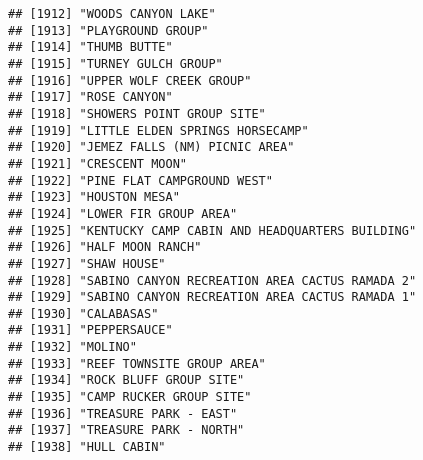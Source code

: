 \documentclass[
]{article}
\begin{document}
\begin{verbatim}
## [1912] "WOODS CANYON LAKE"                                                                   
## [1913] "PLAYGROUND GROUP"                                                                    
## [1914] "THUMB BUTTE"                                                                         
## [1915] "TURNEY GULCH GROUP"                                                                  
## [1916] "UPPER WOLF CREEK GROUP"                                                              
## [1917] "ROSE CANYON"                                                                         
## [1918] "SHOWERS POINT GROUP SITE"                                                            
## [1919] "LITTLE ELDEN SPRINGS HORSECAMP"                                                      
## [1920] "JEMEZ FALLS (NM) PICNIC AREA"                                                        
## [1921] "CRESCENT MOON"                                                                       
## [1922] "PINE FLAT CAMPGROUND WEST"                                                           
## [1923] "HOUSTON MESA"                                                                        
## [1924] "LOWER FIR GROUP AREA"                                                                
## [1925] "KENTUCKY CAMP CABIN AND HEADQUARTERS BUILDING"                                       
## [1926] "HALF MOON RANCH"                                                                     
## [1927] "SHAW HOUSE"                                                                          
## [1928] "SABINO CANYON RECREATION AREA CACTUS RAMADA 2"                                       
## [1929] "SABINO CANYON RECREATION AREA CACTUS RAMADA 1"                                       
## [1930] "CALABASAS"                                                                           
## [1931] "PEPPERSAUCE"                                                                         
## [1932] "MOLINO"                                                                              
## [1933] "REEF TOWNSITE GROUP AREA"                                                            
## [1934] "ROCK BLUFF GROUP SITE"                                                               
## [1935] "CAMP RUCKER GROUP SITE"                                                              
## [1936] "TREASURE PARK - EAST"                                                                
## [1937] "TREASURE PARK - NORTH"                                                               
## [1938] "HULL CABIN"                                                                          

\end{verbatim}
\end{document}
